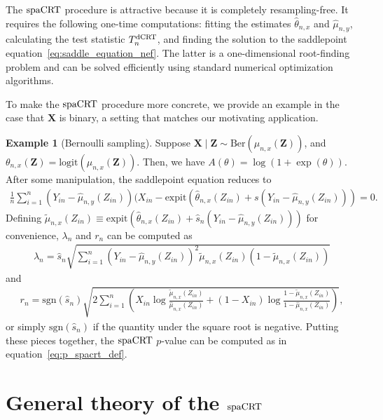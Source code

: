 \documentclass[12pt]{article}
\theoremstyle{definition}
\newtheorem{example}{Example}
\newcommand{\prx}{\bm X}								%
\newcommand{\srx}{X}									%
\newcommand{\prz}{\bm Z}								%
\newcommand{\srz}{Z}									%
\newcommand{\sry}{Y}									%
\newcommand{\dCRT}{\textnormal{dCRT}} 					%
\newcommand{\spacrt}{\textnormal{spaCRT}}               %
\begin{document}
The $\spacrt$ procedure is attractive because it is completely resampling-free. It requires the following one-time computations: fitting the estimates $\widehat \theta_{n,x}$ and $\widehat \mu_{n,y}$, calculating the test statistic $T_n^\dCRT$, and finding the solution to the saddlepoint equation~\eqref{eq:saddle_equation_nef}. The latter is a one-dimensional root-finding problem and can be solved efficiently using standard numerical optimization algorithms. 

To make the $\spacrt$ procedure more concrete, we provide an example in the case that $\prx$ is binary, a setting that matches our motivating application.

\begin{example}[Bernoulli sampling]
  Suppose $\prx\mid\prz\sim \mathrm{Ber}(\mu_{n,x}(\prz))$, and $\theta_{n,x}(\prz) = \text{logit}(\mu_{n,x}(\prz))$. Then, we have $A(\theta) = \log(1 + \exp(\theta))$. After some manipulation, the saddlepoint equation reduces to 
	\begin{align*}
		\frac{1}{n}\sum_{i=1}^n (\sry_{in}-\widehat{\mu}_{n,y}(\srz_{in}))(\srx_{in}-\text{expit}(\widehat \theta_{n,x}(\srz_{in})+s(\sry_{in}-\widehat{\mu}_{n,y}(\srz_{in})))=0.
	\end{align*}
	Defining $\widetilde \mu_{n,x}(Z_{in}) \equiv \text{expit}(\widehat \theta_{n,x}(\srz_{in})+\hat s_n(\sry_{in}-\widehat{\mu}_{n,y}(\srz_{in})))$ for convenience, $\lambda_n$ and $r_n$ can be computed as 
	\begin{align*}
		\lambda_n=\hat s_n \sqrt{\sum_{i=1}^n (\sry_{in}-\widehat{\mu}_{n,y}(\srz_{in}))^2\widetilde \mu_{n,x}(Z_{in})(1-\widetilde \mu_{n,x}(Z_{in}))}
	\end{align*}
	and
	\begin{align*}
		r_n=\mathrm{sgn}(\hat s_n)\sqrt{2\sum_{i=1}^n \left(X_{in} \log \frac{\widetilde \mu_{n,x}(Z_{in})}{\widehat \mu_{n,x}(Z_{in})} + (1 - X_{in})\log \frac{1 - \widetilde \mu_{n,x}(Z_{in})}{1 - \widehat \mu_{n,x}(Z_{in})}\right)},
	\end{align*}
  or simply $\text{sgn}(\hat s_n)$ if the quantity under the square root is negative. Putting these pieces together, the $\spacrt$ $p$-value can be computed as in equation~\eqref{eq:p_spacrt_def}.	
\end{example}

\section{General theory of the $\spacrt$}\label{sec:general_results}
\end{document}
